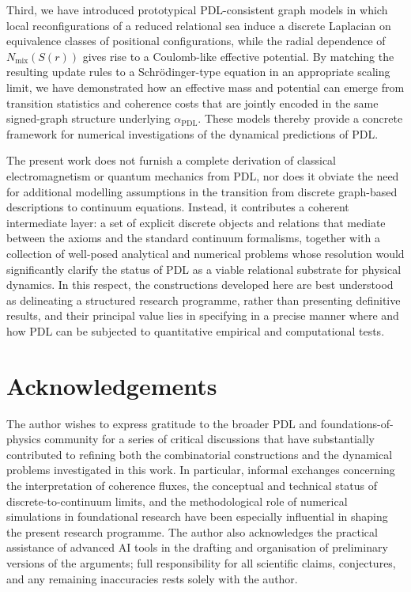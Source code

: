 \documentclass[11pt,a4paper]{article}
\begin{document}
Third, we have introduced prototypical PDL-consistent graph models in which local reconfigurations of a reduced relational sea induce a discrete Laplacian on equivalence classes of positional configurations, while the radial dependence of $N_{\mathrm{mix}}(S(r))$ gives rise to a Coulomb-like effective potential.
By matching the resulting update rules to a Schr\"odinger-type equation in an appropriate scaling limit, we have demonstrated how an effective mass and potential can emerge from transition statistics and coherence costs that are jointly encoded in the same signed-graph structure underlying $\alpha_{\mathrm{PDL}}$.\cite{Laubscher2026SchrodingerSketch}
These models thereby provide a concrete framework for numerical investigations of the dynamical predictions of PDL.

The present work does not furnish a complete derivation of classical electromagnetism or quantum mechanics from PDL, nor does it obviate the need for additional modelling assumptions in the transition from discrete graph-based descriptions to continuum equations.
Instead, it contributes a coherent intermediate layer: a set of explicit discrete objects and relations that mediate between the axioms and the standard continuum formalisms, together with a collection of well-posed analytical and numerical problems whose resolution would significantly clarify the status of PDL as a viable relational substrate for physical dynamics.
In this respect, the constructions developed here are best understood as delineating a structured research programme, rather than presenting definitive results, and their principal value lies in specifying in a precise manner where and how PDL can be subjected to quantitative empirical and computational tests.

\section*{Acknowledgements}

The author wishes to express gratitude to the broader PDL and foundations-of-physics community for a series of critical discussions that have substantially contributed to refining both the combinatorial constructions and the dynamical problems investigated in this work.\cite{Laubscher2026FullPDL}
In particular, informal exchanges concerning the interpretation of coherence fluxes, the conceptual and technical status of discrete-to-continuum limits, and the methodological role of numerical simulations in foundational research have been especially influential in shaping the present research programme.
The author also acknowledges the practical assistance of advanced AI tools in the drafting and organisation of preliminary versions of the arguments; full responsibility for all scientific claims, conjectures, and any remaining inaccuracies rests solely with the author.



\end{document}
